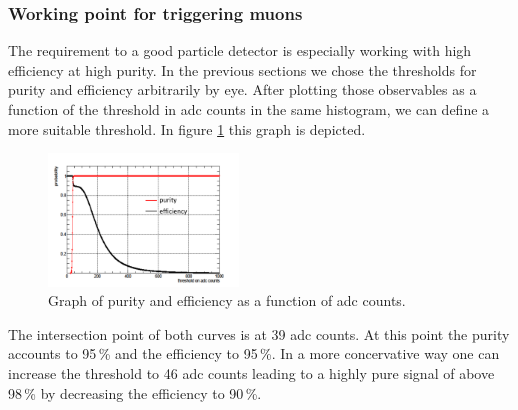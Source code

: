 		\subsubsection{Working point for triggering muons}
		\label{working_point}
			The requirement to a good particle detector is especially working with high efficiency at high purity.
			In the previous sections we chose the thresholds for purity and efficiency arbitrarily by eye.
			After plotting those observables as a function of the threshold in adc counts in the same histogram, we can define a more suitable threshold.
			In figure \ref{fig:pur_eff} this graph is depicted.
			\begin{figure}[htbp]
				\centering
				\includegraphics[width=0.45\textwidth]{Figures/erdogan/pur_eff.png}
				\caption{Graph of purity and efficiency as a function of adc counts.}
				\label{fig:pur_eff}
			\end{figure}
			The intersection point of both curves is at 39 adc counts.
			At this point the purity accounts to 95\,\% and the efficiency to 95\,\%.
			In a more concervative way one can increase the threshold to 46 adc counts leading to a highly pure signal of above 98\,\% by decreasing the efficiency to 90\,\%.